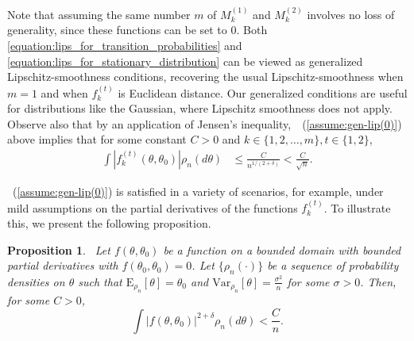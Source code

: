 \documentclass[11pt]{amsart}
\newcommand{\E}{\mathrm{E}}
\newcommand{\Var}{\mathrm{Var}}
\newtheorem{proposition}{Proposition}[section]
\begin{document}
Note that assuming the same number $m$ of $M^{(1)}_k$ and $M^{(2)}_k$ involves no  loss of generality, since these functions can be set to $0$. 
Both \cref{equation:lips_for_transition_probabilities} and \cref{equation:lips_for_stationary_distribution} can be viewed as generalized Lipschitz-smoothness conditions, recovering the usual Lipschitz-smoothness when $m = 1$ and when $f_k^{(t)}$ is Euclidean distance.
Our generalized conditions are useful for distributions like the Gaussian, where Lipschitz smoothness does not apply.
%
Observe also that by an application of Jensen's inequality,~~(\ref{assume:gen-lip(0)}) above implies that  for some constant $C>0$ 
and $k\in \{1,2,\dots,m\}, t \in \{1,2\}$, 
\begin{align}
\int |f^{(t)}_k(\theta,\theta_0)|\rho_n(d\theta) & \leq \frac{C}{n^{1/(2+\delta)}} < \frac{C}{\sqrt{n}}.
     \label{assume:gen-lip(2)}
\end{align}
%

~(\ref{assume:gen-lip(0)}) is satisfied in a variety of scenarios, for example, under mild assumptions on the partial derivatives of the functions $f^{(t)}_k$. 
To illustrate this, we present the following proposition.

\begin{proposition}~\label{prop:3}
Let $f(\theta,\theta_0)$ be a function on a bounded domain with bounded partial derivatives with $f(\theta_0,\theta_0)=0$. Let $\{\rho_n(\cdot)\}$ be a sequence of probability densities on $\theta$ such that $\E_{\rho_n}[\theta]=\theta_0$ and $\Var_{\rho_n}[\theta]=\frac{\sigma^2}{n}$ for some $\sigma>0$. Then, for some $C>0$,
\begin{equation}
    \int|f(\theta,\theta_0)|^{2+\delta}\rho_n(d\theta)<\frac{C}{n}.
\end{equation}
\end{proposition}
\end{document}
